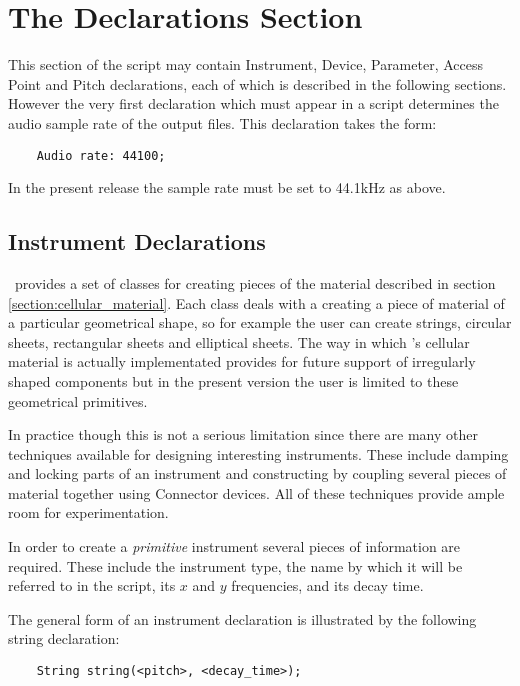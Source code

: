 \section{The Declarations Section}
This section of the script may contain Instrument, Device, Parameter,
Access Point and Pitch declarations, each of which is described in
the following sections. However the very first declaration which
must appear in a script determines the audio sample rate of the output
files. This declaration takes the form:

\begin{verbatim}
    Audio rate: 44100;
\end{verbatim}

In the present release the sample rate must be set to 44.1kHz as above.

\subsection{Instrument Declarations}
\label{section:instrument_declarations}
\tao\ provides a set of classes for creating pieces of the material described
in section \ref{section:cellular_material}. Each class deals with a creating
a piece of material of a particular geometrical shape, so for example the
user can create strings, circular sheets, rectangular sheets and
elliptical sheets. The way in which \tao's cellular material is actually
implementated provides for future support of irregularly shaped
components but in the present version the user is limited to these
geometrical primitives.

In practice though this is not a serious limitation since there are 
many other techniques available for designing interesting instruments.
These include damping and locking parts of an instrument and constructing
 by coupling several pieces of material together
using Connector devices. All of these techniques provide ample
room for experimentation.

In order to create a \emph{primitive} instrument
 several pieces of information are required.
These include the instrument type, the name by which it will be referred
to in the script, its $x$ and $y$ frequencies, and its decay time.

The general form of an instrument declaration is illustrated by the
following string declaration:

\begin{verbatim}
    String string(<pitch>, <decay_time>);
\end{verbatim}


